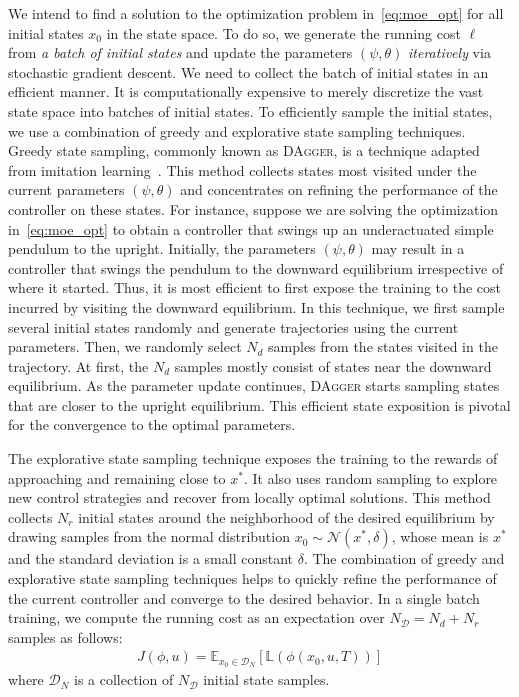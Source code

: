 We intend to find a solution to the optimization problem
in~\eqref{eq:moe_opt} for all initial states $x_0$ in the
state space.
%
To do so, we generate the running cost $\ell$ from \textit{a batch of initial
states} and update the parameters $(\psi, \theta)$ \textit{iteratively} via
stochastic gradient descent.
%
We need to collect the batch of initial states in an efficient manner.
%
It is computationally expensive to merely discretize the vast state
space into batches of initial states. 
%
To efficiently sample the initial states, we use a combination of greedy and
explorative state sampling techniques.
%
Greedy state sampling, commonly known as \textsc{DAgger}, is a technique
adapted from imitation learning~\cite{ross2011no}.
%
This method collects states most visited under the current parameters $(\psi,
\theta)$ and concentrates on refining the performance of the controller on these
states.
%
For instance, suppose we are solving the optimization in~\eqref{eq:moe_opt} to
obtain a controller that swings up an underactuated simple pendulum to the
upright.
Initially, the parameters $(\psi, \theta)$ may result in a controller that swings the
pendulum to the downward equilibrium irrespective of where it started.
%
Thus, it is most efficient to first expose the training to the cost incurred by
visiting the downward equilibrium.
%
In this technique, we first sample several initial states randomly and generate
trajectories using the current parameters.
%
Then, we randomly select $N_d$ samples from the states visited in the trajectory. 
%
At first, the $N_d$ samples mostly consist of states near the downward equilibrium.
%
As the parameter update continues, \textsc{DAgger} starts sampling states that
are closer to the upright equilibrium.
%
This efficient state exposition is pivotal for the convergence to the optimal
parameters.



The explorative state sampling technique exposes the training to the rewards of approaching and 
remaining close to $x^*$.
%
It also uses random sampling to explore new control strategies and recover from locally optimal
solutions.  
%
This method collects $N_r$ initial states around the neighborhood of the desired
equilibrium by drawing samples from the normal distribution $x_0 \sim \mathcal{N}(x^*, \delta)$,
whose mean is $x^*$ and the standard deviation is a small constant $\delta$.
%
The combination of greedy and explorative state sampling techniques helps to
quickly refine the performance of the current controller and converge to the desired behavior.
%
In a single batch training, we compute the running cost as an expectation
over $N_{\mathcal{D}} = N_d+N_r$ samples as follows:
\begin{align*}
    J(\phi, u) = \mathbb{E}_{x_0 \in \mathcal{D}_N}[ \mathbb{L}(\phi(x_0, u, T))]
\end{align*}
\noindent where $\mathcal{D}_N$ is a collection of $N_{\mathcal{D}}$ initial state samples.

